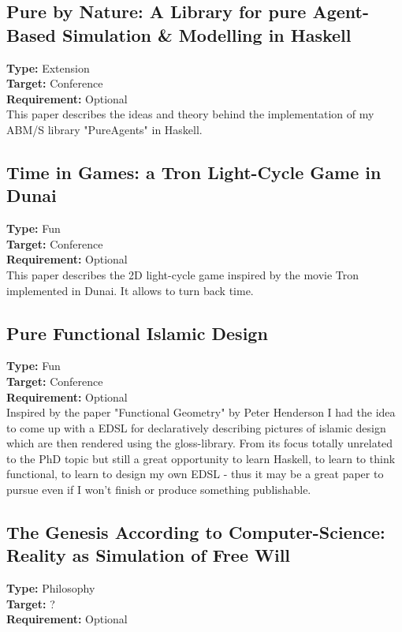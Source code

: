 \subsection{Pure by Nature: A Library for pure Agent-Based Simulation \& Modelling in Haskell}
\textbf{Type:} Extension \\
\textbf{Target:} Conference \\
\textbf{Requirement:} Optional \\

This paper describes the ideas and theory behind the implementation of my ABM/S library "PureAgents" in Haskell.

\subsection{Time in Games: a Tron Light-Cycle Game in Dunai}
\textbf{Type:} Fun \\
\textbf{Target:} Conference \\
\textbf{Requirement:} Optional \\

This paper describes the 2D light-cycle game inspired by the movie Tron implemented in Dunai. It allows to turn back time.

\subsection{Pure Functional Islamic Design}
\textbf{Type:} Fun \\
\textbf{Target:} Conference \\
\textbf{Requirement:} Optional \\

Inspired by the paper "Functional Geometry" by Peter Henderson I had the idea to come up with a  EDSL for declaratively describing pictures of islamic design which are then rendered using the gloss-library. From its focus totally unrelated to the PhD topic but still a great opportunity to learn Haskell, to learn to think functional, to learn to design my own EDSL - thus it may be a great paper to pursue even if I won't finish or produce something publishable.

\subsection{The Genesis According to Computer-Science: Reality as Simulation of Free Will}
\textbf{Type:} Philosophy \\
\textbf{Target:} ? \\
\textbf{Requirement:} Optional \\

